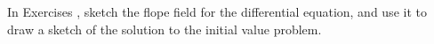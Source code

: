 {\noindent In Exercises}
{, sketch the flope field for the differential equation, and use it to draw a sketch of the solution to the initial value problem.}
